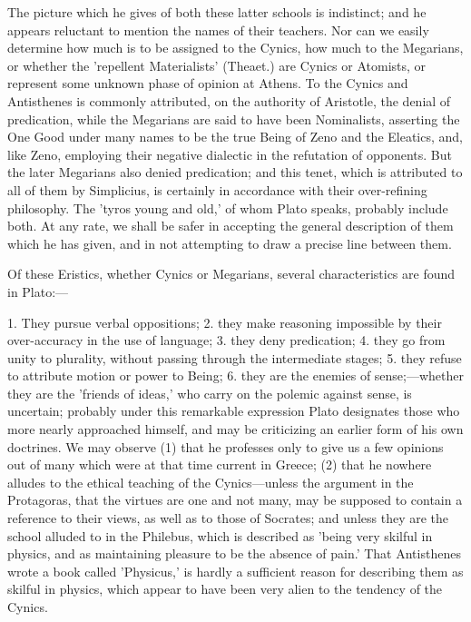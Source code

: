 \documentclass[11pt,letter]{article}
\begin{document}
\par  The picture which he gives of both these latter schools is indistinct; and he appears reluctant to mention the names of their teachers. Nor can we easily determine how much is to be assigned to the Cynics, how much to the Megarians, or whether the 'repellent Materialists' (Theaet.) are Cynics or Atomists, or represent some unknown phase of opinion at Athens. To the Cynics and Antisthenes is commonly attributed, on the authority of Aristotle, the denial of predication, while the Megarians are said to have been Nominalists, asserting the One Good under many names to be the true Being of Zeno and the Eleatics, and, like Zeno, employing their negative dialectic in the refutation of opponents. But the later Megarians also denied predication; and this tenet, which is attributed to all of them by Simplicius, is certainly in accordance with their over-refining philosophy. The 'tyros young and old,' of whom Plato speaks, probably include both. At any rate, we shall be safer in accepting the general description of them which he has given, and in not attempting to draw a precise line between them.

\par  Of these Eristics, whether Cynics or Megarians, several characteristics are found in Plato:—

\par  1. They pursue verbal oppositions; 2. they make reasoning impossible by their over-accuracy in the use of language; 3. they deny predication; 4. they go from unity to plurality, without passing through the intermediate stages; 5. they refuse to attribute motion or power to Being; 6. they are the enemies of sense;—whether they are the 'friends of ideas,' who carry on the polemic against sense, is uncertain; probably under this remarkable expression Plato designates those who more nearly approached himself, and may be criticizing an earlier form of his own doctrines. We may observe (1) that he professes only to give us a few opinions out of many which were at that time current in Greece; (2) that he nowhere alludes to the ethical teaching of the Cynics—unless the argument in the Protagoras, that the virtues are one and not many, may be supposed to contain a reference to their views, as well as to those of Socrates; and unless they are the school alluded to in the Philebus, which is described as 'being very skilful in physics, and as maintaining pleasure to be the absence of pain.' That Antisthenes wrote a book called 'Physicus,' is hardly a sufficient reason for describing them as skilful in physics, which appear to have been very alien to the tendency of the Cynics.
\end{document}
